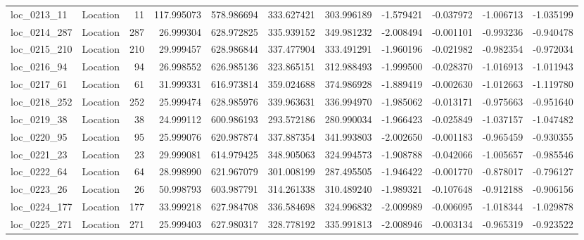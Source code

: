 \begin{tabular}{llrrrrrrrrr}
  loc_0213_11 &        Location &              11 & 117.995073 & 578.986694 &  333.627421 &    303.996189 &  -1.579421 &  -0.037972 &   -1.006713 &     -1.035199 \\
 loc_0214_287 &        Location &             287 &  26.999304 & 628.972825 &  335.939152 &    349.981232 &  -2.008494 &  -0.001101 &   -0.993236 &     -0.940478 \\
 loc_0215_210 &        Location &             210 &  29.999457 & 628.986844 &  337.477904 &    333.491291 &  -1.960196 &  -0.021982 &   -0.982354 &     -0.972034 \\
  loc_0216_94 &        Location &              94 &  26.998552 & 626.985136 &  323.865151 &    312.988493 &  -1.999500 &  -0.028370 &   -1.016913 &     -1.011943 \\
  loc_0217_61 &        Location &              61 &  31.999331 & 616.973814 &  359.024688 &    374.986928 &  -1.889419 &  -0.002630 &   -1.012663 &     -1.119780 \\
 loc_0218_252 &        Location &             252 &  25.999474 & 628.985976 &  339.963631 &    336.994970 &  -1.985062 &  -0.013171 &   -0.975663 &     -0.951640 \\
  loc_0219_38 &        Location &              38 &  24.999112 & 600.986193 &  293.572186 &    280.990034 &  -1.966423 &  -0.025849 &   -1.037157 &     -1.047482 \\
  loc_0220_95 &        Location &              95 &  25.999076 & 620.987874 &  337.887354 &    341.993803 &  -2.002650 &  -0.001183 &   -0.965459 &     -0.930355 \\
  loc_0221_23 &        Location &              23 &  29.999081 & 614.979425 &  348.905063 &    324.994573 &  -1.908788 &  -0.042066 &   -1.005657 &     -0.985546 \\
  loc_0222_64 &        Location &              64 &  28.998990 & 621.967079 &  301.008199 &    287.495505 &  -1.946422 &  -0.001770 &   -0.878017 &     -0.796127 \\
  loc_0223_26 &        Location &              26 &  50.998793 & 603.987791 &  314.261338 &    310.489240 &  -1.989321 &  -0.107648 &   -0.912188 &     -0.906156 \\
 loc_0224_177 &        Location &             177 &  33.999218 & 627.984708 &  336.584698 &    324.996832 &  -2.009989 &  -0.006095 &   -1.018344 &     -1.029878 \\
 loc_0225_271 &        Location &             271 &  25.999403 & 627.980317 &  328.778192 &    335.991813 &  -2.008946 &  -0.003134 &   -0.965319 &     -0.923522 \\

\end{tabular}
